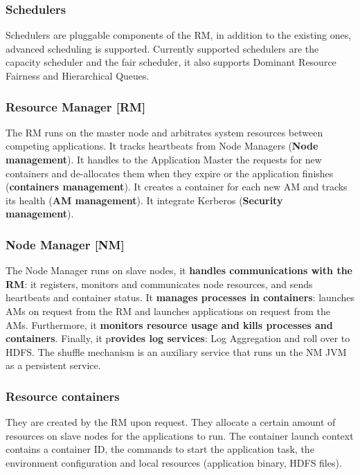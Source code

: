 		\subsubsection{Schedulers}
		Schedulers are pluggable components of the RM, in addition to the existing ones, advanced scheduling is supported. Currently supported schedulers are the capacity scheduler and the fair scheduler, it also supports Dominant Resource Fairness and Hierarchical Queues.
		\subsubsection{Resource Manager [RM]}
		The RM runs on the master node and arbitrates system resources between competing applications.\newline
		It tracks heartbeats from Node Managers (\textbf{Node management}).\newline
		It handles to the Application Master the requests for new containers and de-allocates them when they expire or the application finishes (\textbf{containers management}).\newline
		It creates a container for each new AM and tracks its health (\textbf{AM management}).\newline
		It integrate Kerberos (\textbf{Security management}).
		\subsubsection{Node Manager [NM]}
		The Node Manager runs on slave nodes, it \textbf{handles communications with the RM}: it registers, monitors and communicates node resources, and sends heartbeats and container status.\newline
		It \textbf{manages processes in containers}: launches AMs on request from the RM and launches applications on request from the AMs. Furthermore, it \textbf{monitors resource usage and kills processes and containers}.\newline
		Finally, it p\textbf{rovides log services}: Log Aggregation and roll over to HDFS.\newline
		The shuffle mechanism is an auxiliary service that runs un the NM JVM as a persistent service.
		\subsubsection{Resource containers}
		They are created by the RM upon request. They allocate a certain amount of resources on slave nodes for the applications to run.\newline
		The container launch context contains a container ID, the commands to start the application task, the environment configuration and local resources (application binary, HDFS files).
